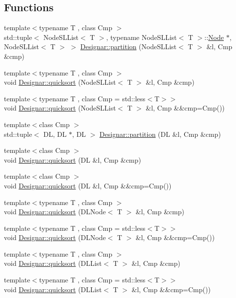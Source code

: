 \subsection*{Functions}
\begin{DoxyCompactItemize}
\item 
{\footnotesize template$<$typename T , class Cmp $>$ }\\std\+::tuple$<$ Node\+S\+L\+List$<$ T $>$, typename Node\+S\+L\+List$<$ T $>$\+::\hyperlink{test-mtreenode_8_c_a17a24b0725f59987143c5faf63c4dc6f}{Node} $\ast$, Node\+S\+L\+List$<$ T $>$ $>$ \hyperlink{namespace_designar_acbe78eef938395624f248f069fcc3de0}{Designar\+::partition} (Node\+S\+L\+List$<$ T $>$ \&l, Cmp \&cmp)
\item 
{\footnotesize template$<$typename T , class Cmp $>$ }\\void \hyperlink{namespace_designar_a7e1e90568197223b560306a01b496969}{Designar\+::quicksort} (Node\+S\+L\+List$<$ T $>$ \&l, Cmp \&cmp)
\item 
{\footnotesize template$<$typename T , class Cmp  = std\+::less$<$\+T$>$$>$ }\\void \hyperlink{namespace_designar_a7a2c6974344050666f37a5f9cdf889a4}{Designar\+::quicksort} (Node\+S\+L\+List$<$ T $>$ \&l, Cmp \&\&cmp=Cmp())
\item 
{\footnotesize template$<$class Cmp $>$ }\\std\+::tuple$<$ DL, DL $\ast$, DL $>$ \hyperlink{namespace_designar_af9be3d9a9287bf17a54090b14c06c611}{Designar\+::partition} (DL \&l, Cmp \&cmp)
\item 
{\footnotesize template$<$class Cmp $>$ }\\void \hyperlink{namespace_designar_a8c58e24da6b5bd73a9218ece3ec9f54f}{Designar\+::quicksort} (DL \&l, Cmp \&cmp)
\item 
{\footnotesize template$<$class Cmp $>$ }\\void \hyperlink{namespace_designar_abeece6dc0f858ceaf46690f5b26b2512}{Designar\+::quicksort} (DL \&l, Cmp \&\&cmp=Cmp())
\item 
{\footnotesize template$<$typename T , class Cmp $>$ }\\void \hyperlink{namespace_designar_a5e44455a1442b74351b0fb9f9519581f}{Designar\+::quicksort} (D\+L\+Node$<$ T $>$ \&l, Cmp \&cmp)
\item 
{\footnotesize template$<$typename T , class Cmp  = std\+::less$<$\+T$>$$>$ }\\void \hyperlink{namespace_designar_a5a756296262619dd1deb6195ad0ec2a0}{Designar\+::quicksort} (D\+L\+Node$<$ T $>$ \&l, Cmp \&\&cmp=Cmp())
\item 
{\footnotesize template$<$typename T , class Cmp $>$ }\\void \hyperlink{namespace_designar_abdb3fae2c35a0696dfb66711eb224f5a}{Designar\+::quicksort} (D\+L\+List$<$ T $>$ \&l, Cmp \&cmp)
\item 
{\footnotesize template$<$typename T , class Cmp  = std\+::less$<$\+T$>$$>$ }\\void \hyperlink{namespace_designar_a199363a09da37dd34fdf7d151441fa44}{Designar\+::quicksort} (D\+L\+List$<$ T $>$ \&l, Cmp \&\&cmp=Cmp())
\end{DoxyCompactItemize}
